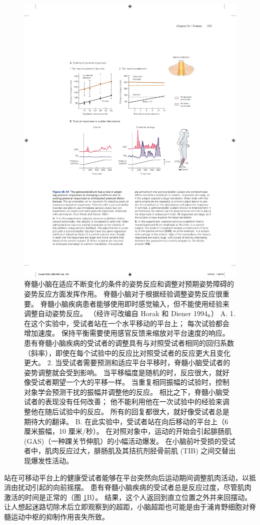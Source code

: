 \begin{figure}[htbp]
	\centering
	\includegraphics[width=0.8\linewidth]{chap36/fig_36_14}
	\caption{脊髓小脑在适应不断变化的条件的姿势反应和调整对预期姿势障碍的姿势反应方面发挥作用。 脊髓小脑对于根据经验调整姿势反应很重要。 脊髓小脑疾病患者能够使用即时感觉输入，但不能使用经验来调整自动姿势反应。 （经许可改编自 Horak 和 Diener 1994。） A. 1. 在这个实验中，受试者站在一个水平移动的平台上； 每次试验都会增加速度。 保持平衡需要使用感官反馈来缩放对平台速度的响应。 患有脊髓小脑疾病的受试者的调整具有与对照受试者相同的回归系数（斜率），即使在每个试验中的反应比对照受试者的反应更大且变化更大。 2. 当受试者需要预测和适应平台平移时，脊髓小脑受试者的姿势调整就会受到影响。 当平移幅度是随机的时，反应很大，就好像受试者期望一个大的平移一样。 当重复相同振幅的试验时，控制对象学会预测干扰的振幅并调整他的反应。 相比之下，脊髓小脑受试者的表现没有任何改善； 他不能利用他在一次试验中的经验来调整他在随后试验中的反应。 所有的回复都很大，就好像受试者总是期待大的翻译。 B. 在此实验中，受试者站在向后移动的平台上（6 厘米振幅，10 厘米/秒）。 在对照对象中，运动的开始会引起腓肠肌 (GAS)（一种踝关节伸肌）的小幅活动爆发。 在小脑前叶受损的受试者中，肌肉反应过大，腓肠肌及其拮抗剂胫骨前肌 (TIB) 之间交替出现爆发性活动。}
	\label{fig:36_14}
\end{figure}

站在可移动平台上的健康受试者能够在平台突然向后运动期间调整肌肉活动，以抵消由扰动引起的向前摇摆。 患有脊髓小脑疾病的受试者总是反应过度，尽管肌肉激活的时间是正常的（图 \ref{fig:36_14}B）。 结果，这个人返回到直立位置之外并来回摆动。 让人想起迷路切除术后立即观察到的超距，小脑超距也可能是由于浦肯野细胞对脊髓运动中枢的抑制作用丧失所致。

